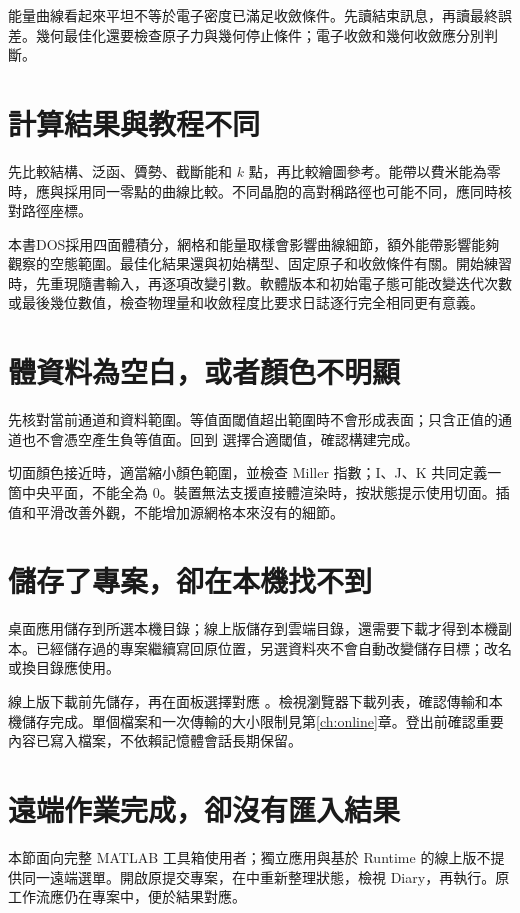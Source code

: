 能量曲線看起來平坦不等於電子密度已滿足收斂條件。先讀結束訊息，再讀最終誤差。幾何最佳化還要檢查原子力與幾何停止條件；電子收斂和幾何收斂應分別判斷。

\section{計算結果與教程不同}

先比較結構、泛函、贗勢、截斷能和 $k$ 點，再比較繪圖參考。能帶以費米能為零時，應與採用同一零點的曲線比較。不同晶胞的高對稱路徑也可能不同，應同時核對路徑座標。

本書DOS採用四面體積分，網格和能量取樣會影響曲線細節，額外能帶影響能夠觀察的空態範圍。最佳化結果還與初始構型、固定原子和收斂條件有關。開始練習時，先重現隨書輸入，再逐項改變引數。軟體版本和初始電子態可能改變迭代次數或最後幾位數值，檢查物理量和收斂程度比要求日誌逐行完全相同更有意義。

\section{體資料為空白，或者顏色不明顯}

先核對當前通道和資料範圍。等值面閾值超出範圍時不會形成表面；只含正值的通道也不會憑空產生負等值面。回到  選擇合適閾值，確認構建完成。

切面顏色接近時，適當縮小顏色範圍，並檢查 Miller 指數；I、J、K 共同定義一箇中央平面，不能全為 0。裝置無法支援直接體渲染時，按狀態提示使用切面。插值和平滑改善外觀，不能增加源網格本來沒有的細節。

\section{儲存了專案，卻在本機找不到}

桌面應用儲存到所選本機目錄；線上版儲存到雲端目錄，還需要下載才得到本機副本。已經儲存過的專案繼續寫回原位置，另選資料夾不會自動改變儲存目標；改名或換目錄應使用。

線上版下載前先儲存，再在面板選擇對應 。檢視瀏覽器下載列表，確認傳輸和本機儲存完成。單個檔案和一次傳輸的大小限制見第\ref{ch:online}章。登出前確認重要內容已寫入檔案，不依賴記憶體會話長期保留。

\section{遠端作業完成，卻沒有匯入結果}

本節面向完整 MATLAB\regmark{} 工具箱使用者；獨立應用與基於 Runtime 的線上版不提供同一遠端選單。開啟原提交專案，在中重新整理狀態，檢視 Diary，再執行。原工作流應仍在專案中，便於結果對應。

